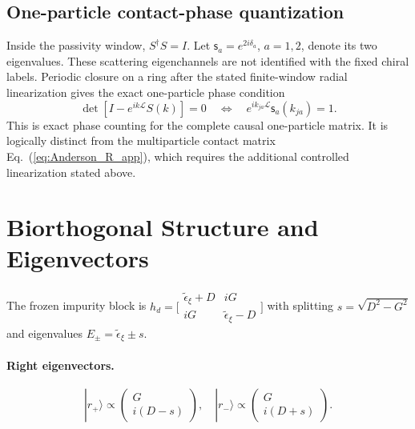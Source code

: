 \documentclass[%
  aps,prb,reprint,amsmath,amssymb,superscriptaddress,longbibliography,floatfix
]{revtex4-2}
\newcommand{\teps}{\tilde{\epsilon}_{\xi}}
\begin{document}
\subsection{One-particle contact-phase quantization}

Inside the passivity window, $S^\dagger S=I$.  Let
$\mathsf{s}_a=e^{2i\delta_a}$, $a=1,2$, denote its two eigenvalues.
These scattering eigenchannels are not identified with the fixed chiral
labels.  Periodic closure on a ring after the stated finite-window radial
linearization gives the exact one-particle phase condition
\begin{equation}
\det[I-e^{ik\mathcal L}S(k)]=0
\quad\Longleftrightarrow\quad
e^{ik_{ja}\mathcal L}\mathsf{s}_a(k_{ja})=1 .
\label{eq:S_full_quantization}
\end{equation}
This is exact phase counting for the complete causal one-particle matrix.
It is logically distinct from the multiparticle contact matrix
Eq.~(\ref{eq:Anderson_R_app}), which requires the additional controlled
linearization stated above.

\section{Biorthogonal Structure and Eigenvectors}
\label{app:biorth}

The frozen impurity block is
$h_d=\bigl[\begin{smallmatrix}
\teps+D&iG\\iG&\teps-D\end{smallmatrix}\bigr]$
with splitting $s=\sqrt{D^2-G^2}$ and eigenvalues
$E_\pm=\teps\pm s$.

\paragraph{Right eigenvectors.}
\begin{equation}
|r_+\rangle\propto\begin{pmatrix}G\\i(D-s)\end{pmatrix},\quad
|r_-\rangle\propto\begin{pmatrix}G\\i(D+s)\end{pmatrix}.
\label{eq:right_evecs}
\end{equation}
\end{document}
